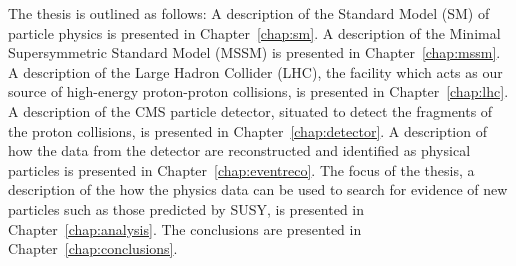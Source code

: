 The thesis is outlined as follows: A description of the Standard Model (SM) of particle physics is presented in Chapter~\ref{chap:sm}. A description of the Minimal Supersymmetric Standard Model (MSSM) is presented in Chapter~\ref{chap:mssm}. A description of the Large Hadron Collider (LHC), the facility which acts as our source of high-energy proton-proton collisions, is presented in Chapter~\ref{chap:lhc}. A description of the CMS particle detector, situated to detect the fragments of the proton collisions, is presented in Chapter~\ref{chap:detector}. A description of how the data from the detector are reconstructed and identified as physical particles is presented in Chapter~\ref{chap:eventreco}. The focus of the thesis, a description of the how the physics data can be used to search for evidence of new particles such as those predicted by SUSY, is presented in Chapter~\ref{chap:analysis}. The conclusions are presented in Chapter~\ref{chap:conclusions}.
